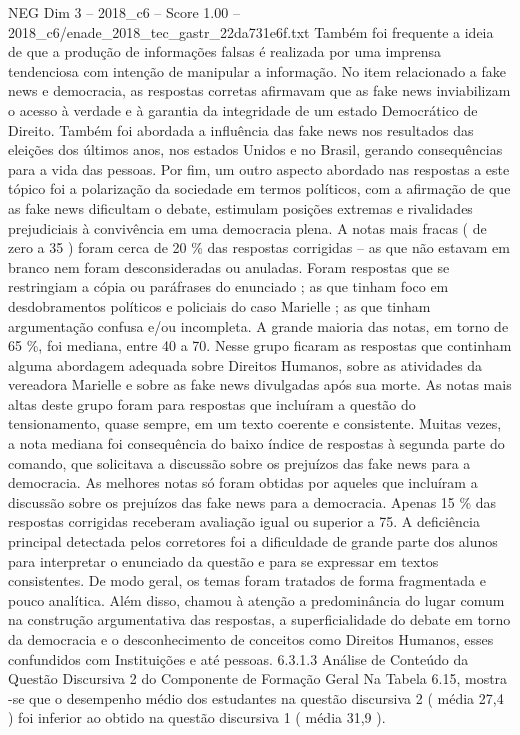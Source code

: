 \begin{textsample}{NEG Dim 3 – 2018\_c6 – Score 1.00 – 2018\_c6/enade\_2018\_tec\_gastr\_22da731e6f.txt}
Também foi frequente a ideia de que a produção de informações falsas é realizada por uma imprensa tendenciosa com intenção de manipular a informação.
No item relacionado a fake news e democracia, as respostas corretas afirmavam que as fake news inviabilizam o acesso à verdade e à garantia da integridade de um estado Democrático de Direito.
Também foi abordada a influência das fake news nos resultados das eleições dos últimos anos, nos estados Unidos e no Brasil, gerando consequências para a vida das pessoas.
Por fim, um outro aspecto abordado nas respostas a este tópico foi a polarização da sociedade em termos políticos, com a afirmação de que as fake news dificultam o debate, estimulam posições extremas e rivalidades prejudiciais à convivência em uma democracia plena.
A notas mais fracas ( de zero a 35 ) foram cerca de 20 \% das respostas corrigidas – as que não estavam em branco nem foram desconsideradas ou anuladas.
Foram respostas que se restringiam a cópia ou paráfrases do enunciado ; as que tinham foco em desdobramentos políticos e policiais do caso Marielle ; as que tinham argumentação confusa e/ou incompleta.
A grande maioria das notas, em torno de 65 \%, foi mediana, entre 40 a 70.
Nesse grupo ficaram as respostas que continham alguma abordagem adequada sobre Direitos Humanos, sobre as atividades da vereadora Marielle e sobre as fake news divulgadas após sua morte.
As notas mais altas deste grupo foram para respostas que incluíram a questão do tensionamento, quase sempre, em um texto coerente e consistente.
Muitas vezes, a nota mediana foi consequência do baixo índice de respostas à segunda parte do comando, que solicitava a discussão sobre os prejuízos das fake news para a democracia.
As melhores notas só foram obtidas por aqueles que incluíram a discussão sobre os prejuízos das fake news para a democracia.
Apenas 15 \% das respostas corrigidas receberam avaliação igual ou superior a 75.
A deficiência principal detectada pelos corretores foi a dificuldade de grande parte dos alunos para interpretar o enunciado da questão e para se expressar em textos consistentes.
De modo geral, os temas foram tratados de forma fragmentada e pouco analítica.
Além disso, chamou à atenção a predominância do lugar comum na construção argumentativa das respostas, a superficialidade do debate em torno da democracia e o desconhecimento de conceitos como Direitos Humanos, esses confundidos com Instituições e até pessoas. 6.3.1.3 Análise de Conteúdo da Questão Discursiva 2 do Componente de Formação Geral Na Tabela 6.15, mostra -se que o desempenho médio dos estudantes na questão discursiva 2 ( média 27,4 ) foi inferior ao obtido na questão discursiva 1 ( média 31,9 ).

\end{textsample}
